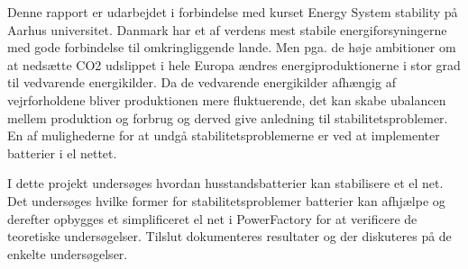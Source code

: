 
\label{Indledning}

Denne rapport er udarbejdet i forbindelse med kurset Energy System stability på Aarhus universitet. 
Danmark har et af verdens mest stabile energiforsyningerne med gode forbindelse til omkringliggende lande. Men pga. de høje ambitioner om at nedsætte CO2 udslippet i hele Europa ændres energiproduktionerne i stor grad til vedvarende energikilder. Da de vedvarende energikilder afhængig af vejrforholdene bliver produktionen mere fluktuerende, det kan skabe ubalancen mellem produktion og forbrug og derved give anledning til stabilitetsproblemer. En af mulighederne for at undgå stabilitetsproblemerne er ved at implementer batterier i el nettet.

I dette projekt undersøges hvordan husstandsbatterier kan stabilisere et el net. Det undersøges hvilke former for stabilitetsproblemer batterier kan afhjælpe og derefter opbygges et simplificeret el net i PowerFactory for at verificere de teoretiske undersøgelser. Tilslut dokumenteres resultater og der diskuteres på de enkelte undersøgelser.

